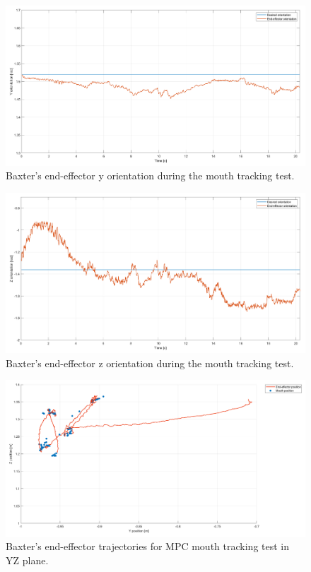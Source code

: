 \documentclass[11pt]{report} %
\begin{document}
\begin{figure}[H]
    \centering
    \includegraphics[width=1.0\linewidth]{assets/imgs/control_theory/mpc_tracking/y_orientation.png}
    \caption{Baxter's end-effector y orientation during the mouth tracking test.} 
    \label{fig_baxter_y_orientation_mpc_tracking_experiments}
\end{figure}

\begin{figure}[H]
    \centering
    \includegraphics[width=1.0\linewidth]{assets/imgs/control_theory/mpc_tracking/z_orientation.png}
    \caption{Baxter's end-effector z orientation during the mouth tracking test.} 
    \label{fig_baxter_z_orientation_mpc_tracking_experiments}
\end{figure}

\begin{figure}[H]
    \centering
    \includegraphics[width=1.0\linewidth]{assets/imgs/control_theory/mpc_tracking/yz_view.png}
    \caption{Baxter's end-effector trajectories for MPC mouth tracking test in YZ plane.} 
    \label{fig_yz_view_mpc_tracking_experiments}
\end{figure}
\end{document}

